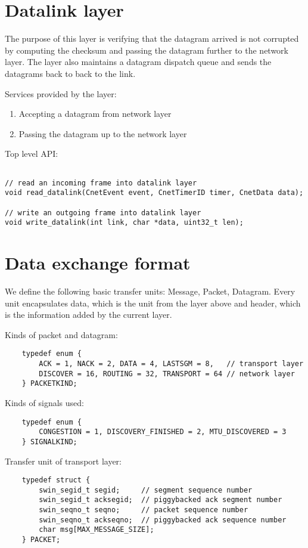 \documentclass[11pt,a4paper,oneside]{report}
\begin{document}
\section*{Datalink layer} 
The purpose of this layer is verifying that the datagram arrived is not
corrupted by computing the checksum and passing the datagram further to
the network layer. The layer also maintains a datagram dispatch queue 
and sends the datagrams back to back to the link.
    
    Services provided by the layer:
    \begin{enumerate}
      \item Accepting a datagram from network layer
      \item Passing the datagram up to the network layer 
    \end{enumerate}
    \newpage
    Top level API: 
  \begin{lstlisting}

// read an incoming frame into datalink layer
void read_datalink(CnetEvent event, CnetTimerID timer, CnetData data);

// write an outgoing frame into datalink layer
void write_datalink(int link, char *data, uint32_t len);

  \end{lstlisting} 
 
\section*{Data exchange format}

We define the following basic transfer units: Message, Packet, Datagram.
Every unit encapsulates data, which is the unit from the layer above and header, 
which is the information added by the current layer. 

Kinds of packet and datagram:
    \begin{lstlisting}
    typedef enum {
        ACK = 1, NACK = 2, DATA = 4, LASTSGM = 8,   // transport layer
        DISCOVER = 16, ROUTING = 32, TRANSPORT = 64 // network layer
    } PACKETKIND;
    \end{lstlisting}    
Kinds of signals used:
    \begin{lstlisting}
    typedef enum {
        CONGESTION = 1, DISCOVERY_FINISHED = 2, MTU_DISCOVERED = 3
    } SIGNALKIND;
    \end{lstlisting}
Transfer unit of transport layer:       
    \begin{lstlisting}
    typedef struct {
        swin_segid_t segid;     // segment sequence number
        swin_segid_t acksegid;  // piggybacked ack segment number
        swin_seqno_t seqno;     // packet sequence number
        swin_seqno_t ackseqno;  // piggybacked ack sequence number
        char msg[MAX_MESSAGE_SIZE];
    } PACKET;
    \end{lstlisting}
  
\end{document}
